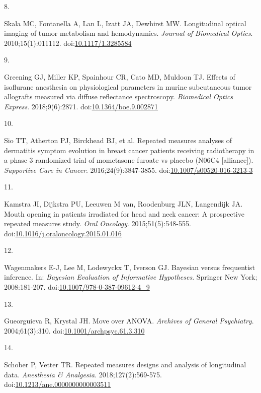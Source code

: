 \documentclass[
]{article}
\newlength{\cslhangindent}
\newlength{\csllabelwidth}
\newlength{\cslentryspacingunit} %
\newenvironment{CSLReferences}[2] %
 {%
  \setlength{\parindent}{0pt}
  \ifodd #1
  \let\oldpar\par
  \def\par{\hangindent=\cslhangindent\oldpar}
  \fi
  \setlength{\parskip}{#2\cslentryspacingunit}
 }%
 {}
\newcommand{\CSLLeftMargin}[1]{\parbox[t]{\csllabelwidth}{#1}}
\newcommand{\CSLRightInline}[1]{\parbox[t]{\linewidth - \csllabelwidth}{#1}\break}
\begin{document}
\begin{CSLReferences}{0}{0}
\leavevmode{}%
\CSLLeftMargin{8. }
\CSLRightInline{Skala MC, Fontanella A, Lan L, Izatt JA, Dewhirst MW. Longitudinal optical imaging of tumor metabolism and hemodynamics. \emph{Journal of Biomedical Optics}. 2010;15(1):011112. doi:\href{https://doi.org/10.1117/1.3285584}{10.1117/1.3285584}}

\leavevmode{}%
\CSLLeftMargin{9. }
\CSLRightInline{Greening GJ, Miller KP, Spainhour CR, Cato MD, Muldoon TJ. Effects of isoflurane anesthesia on physiological parameters in murine subcutaneous tumor allografts measured via diffuse reflectance spectroscopy. \emph{Biomedical Optics Express}. 2018;9(6):2871. doi:\href{https://doi.org/10.1364/boe.9.002871}{10.1364/boe.9.002871}}

\leavevmode{}%
\CSLLeftMargin{10. }
\CSLRightInline{Sio TT, Atherton PJ, Birckhead BJ, et al. Repeated measures analyses of dermatitis symptom evolution in breast cancer patients receiving radiotherapy in a phase 3 randomized trial of mometasone furoate vs placebo (N06C4 {[}alliance{]}). \emph{Supportive Care in Cancer}. 2016;24(9):3847-3855. doi:\href{https://doi.org/10.1007/s00520-016-3213-3}{10.1007/s00520-016-3213-3}}

\leavevmode{}%
\CSLLeftMargin{11. }
\CSLRightInline{Kamstra JI, Dijkstra PU, Leeuwen M van, Roodenburg JLN, Langendijk JA. Mouth opening in patients irradiated for head and neck cancer: A prospective repeated measures study. \emph{Oral Oncology}. 2015;51(5):548-555. doi:\href{https://doi.org/10.1016/j.oraloncology.2015.01.016}{10.1016/j.oraloncology.2015.01.016}}

\leavevmode{}%
\CSLLeftMargin{12. }
\CSLRightInline{Wagenmakers E-J, Lee M, Lodewyckx T, Iverson GJ. Bayesian versus frequentist inference. In: \emph{Bayesian Evaluation of Informative Hypotheses}. Springer New York; 2008:181-207. doi:\href{https://doi.org/10.1007/978-0-387-09612-4_9}{10.1007/978-0-387-09612-4\_9}}

\leavevmode{}%
\CSLLeftMargin{13. }
\CSLRightInline{Gueorguieva R, Krystal JH. Move over {ANOVA}. \emph{Archives of General Psychiatry}. 2004;61(3):310. doi:\href{https://doi.org/10.1001/archpsyc.61.3.310}{10.1001/archpsyc.61.3.310}}

\leavevmode{}%
\CSLLeftMargin{14. }
\CSLRightInline{Schober P, Vetter TR. Repeated measures designs and analysis of longitudinal data. \emph{Anesthesia {\&} Analgesia}. 2018;127(2):569-575. doi:\href{https://doi.org/10.1213/ane.0000000000003511}{10.1213/ane.0000000000003511}}


\end{CSLReferences}
\end{document}
